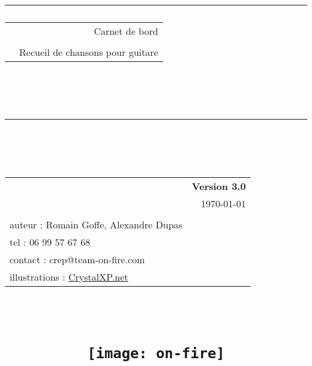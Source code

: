 \newlength{\larg}
\setlength{\larg}{14.5cm}

\title{
{\rule{\larg}{1mm}}\vspace{7mm}
\begin{tabular}{p{4cm} r}
   & {\Huge Carnet de bord} \\
   & \\
   & {\Large Recueil de chansons pour guitare}
\end{tabular}\\
\vspace{2mm}
{\rule{\larg}{1mm}}
\vspace{2mm} \\
\begin{tabular}{p{11cm} r}
   & {\large \bf Version 3.0} \\
   & {\large  \today} \\
   & \\
   \small auteur : Romain Goffe, Alexandre Dupas & \\
   \small tel : 06 99 57 67 68 & \\
   \small contact : crep@team-on-fire.com & \\
   \small illustrations : \href{http://tux.crystalxp.net/}{CrystalXP.net}
   & \\
   \hline
\end{tabular}\\
\vspace{2cm}
\begin{flushleft}\texttt{[image: on-fire]}\end{flushleft}
}
\author{}
\date{}
